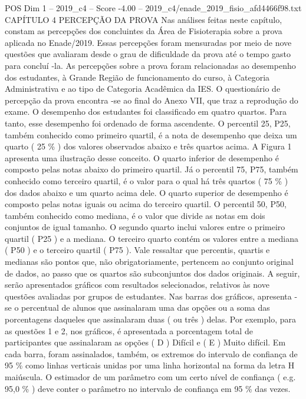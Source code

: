 \begin{textsample}{POS Dim 1 – 2019\_c4 – Score -4.00 – 2019\_c4/enade\_2019\_fisio\_afd4466f98.txt}  \label{ex:f1_pos_348}
CAPÍTULO 4 PERCEPÇÃO DA PROVA Nas análises feitas neste capítulo, constam as percepções dos concluintes da Área de Fisioterapia sobre a prova aplicada no Enade/2019.
Essas percepções foram mensuradas por meio de nove questões que avaliaram desde o grau de dificuldade da prova até o tempo gasto para concluí -la.
As percepções sobre a prova foram relacionadas ao desempenho dos estudantes, à Grande Região de funcionamento do curso, à Categoria Administrativa e ao tipo de Categoria Acadêmica da IES.
O questionário de percepção da prova encontra -se ao final do Anexo VII, que traz a reprodução do exame.
O desempenho dos estudantes foi classificado em quatro quartos.
Para tanto, esse desempenho foi ordenado de forma ascendente.
O percentil 25, P25, também conhecido como primeiro quartil, é a nota de desempenho que deixa um quarto ( 25 \% ) dos valores observados abaixo e três quartos acima.
A Figura 1 apresenta uma ilustração desse conceito.
O quarto inferior de desempenho é composto pelas notas abaixo do primeiro quartil.
Já o percentil 75, P75, também conhecido como terceiro quartil, é o valor para o qual há três quartos ( 75 \% ) dos dados abaixo e um quarto acima dele.
O quarto superior de desempenho é composto pelas notas iguais ou acima do terceiro quartil.
O percentil 50, P50, também conhecido como mediana, é o valor que divide as notas em dois conjuntos de igual tamanho.
O segundo quarto inclui valores entre o primeiro quartil ( P25 ) e a mediana.
O terceiro quarto contém os valores entre a mediana ( P50 ) e o terceiro quartil ( P75 ).
Vale ressaltar que percentis, quartis e medianas são pontos que, não obrigatoriamente, pertencem ao conjunto original de dados, ao passo que os quartos são subconjuntos dos dados originais.
A seguir, serão apresentados gráficos com resultados selecionados, relativos às nove questões avaliadas por grupos de estudantes.
Nas barras dos gráficos, apresenta -se o percentual de alunos que assinalaram uma das opções ou a soma das porcentagens daqueles que assinalaram duas ( ou três ) delas.
Por exemplo, para as questões 1 e 2, nos gráficos, é apresentada a porcentagem total de participantes que assinalaram as opções ( D ) Difícil e ( E ) Muito difícil.
Em cada barra, foram assinalados, também, os extremos do intervalo de confiança de 95 \% como linhas verticais unidas por uma linha horizontal na forma da letra H maiúscula.
O estimador de um parâmetro com um certo nível de confiança ( e.g. 95,0 \% ) deve conter o parâmetro no intervalo de confiança em 95 \% das vezes.

\end{textsample}
